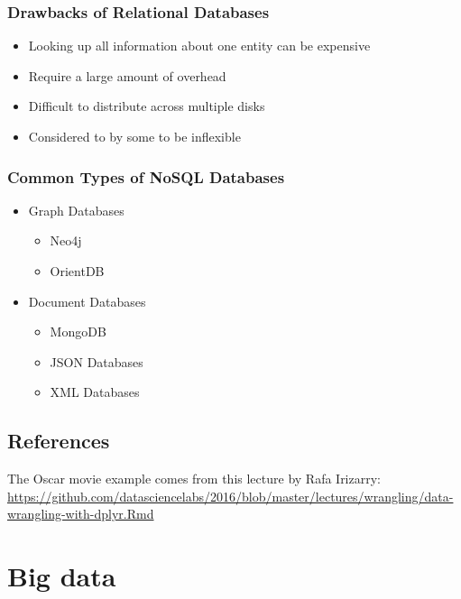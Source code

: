 \documentclass[]{book}
\providecommand{\tightlist}{%
  \setlength{\itemsep}{0pt}\setlength{\parskip}{0pt}}
\theoremstyle{definition}
\theoremstyle{definition}
\theoremstyle{definition}
\theoremstyle{remark}
\begin{document}
\subsection{Drawbacks of Relational
Databases}\label{drawbacks-of-relational-databases}

\begin{itemize}
\tightlist
\item
  Looking up all information about one entity can be expensive
\item
  Require a large amount of overhead
\item
  Difficult to distribute across multiple disks
\item
  Considered to by some to be inflexible
\end{itemize}

\subsection{Common Types of NoSQL
Databases}\label{common-types-of-nosql-databases}

\begin{itemize}
\tightlist
\item
  Graph Databases

  \begin{itemize}
  \tightlist
  \item
    Neo4j
  \item
    OrientDB
  \end{itemize}
\item
  Document Databases

  \begin{itemize}
  \tightlist
  \item
    MongoDB
  \item
    JSON Databases
  \item
    XML Databases
  \end{itemize}
\end{itemize}

\section{References}\label{references}

The Oscar movie example comes from this lecture by Rafa Irizarry:
\url{https://github.com/datasciencelabs/2016/blob/master/lectures/wrangling/data-wrangling-with-dplyr.Rmd}

\chapter{Big data}\label{bigdata}
\end{document}
